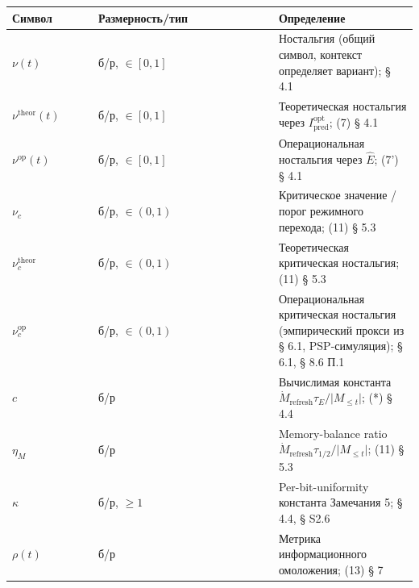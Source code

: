 \documentclass[pdflatex,sn-mathphys-ay]{sn-jnl}
\begin{document}
\begin{center}\small
\begin{tabular}{@{} >{\raggedright\arraybackslash}p{0.2105\linewidth} >{\raggedright\arraybackslash}p{0.4474\linewidth} >{\raggedright\arraybackslash}p{0.3421\linewidth}@{}}
\toprule

\begin{minipage}[b]{\linewidth}\raggedright

Символ

\end{minipage} & \begin{minipage}[b]{\linewidth}\raggedright

Размерность/тип

\end{minipage} & \begin{minipage}[b]{\linewidth}\raggedright

Определение

\end{minipage} \\

\midrule

\(\nu(t)\) & б/р, \(\in [0, 1]\) & Ностальгия (общий символ, контекст определяет вариант); § 4.1 \\

\(\nu^{\text{theor}}(t)\) & б/р, \(\in [0, 1]\) & Теоретическая ностальгия через \(I_{\text{pred}}^{\text{opt}}\); (7) § 4.1 \\

\(\nu^{\text{op}}(t)\) & б/р, \(\in [0, 1]\) & Операциональная ностальгия через \(\hat E\); (7') § 4.1 \\

\(\nu_c\) & б/р, \(\in (0, 1)\) & Критическое значение / порог режимного перехода; (11) § 5.3 \\

\(\nu_c^{\text{theor}}\) & б/р, \(\in (0, 1)\) & Теоретическая критическая ностальгия; (11) § 5.3 \\

\(\nu_c^{\text{op}}\) & б/р, \(\in (0, 1)\) & Операциональная критическая ностальгия (эмпирический прокси из § 6.1, PSP-симуляция); § 6.1, § 8.6 П.1 \\

\(c\) & б/р & Вычислимая константа \(\dot{M}_{\text{refresh}} \tau_E / \lvert M_{\le t}\rvert\); (*) § 4.4 \\

\(\eta_M\) & б/р & Memory-balance ratio \(\dot{M}_{\text{refresh}} \tau_{1/2}/\lvert M_{\le t}\rvert\); (11) § 5.3 \\

\(\kappa\) & б/р, \(\ge 1\) & Per-bit-uniformity константа Замечания 5; § 4.4, § S2.6 \\

\(\rho(t)\) & б/р & Метрика информационного омоложения; (13) § 7 \\

\bottomrule
\end{tabular}
\end{center}
\end{document}
